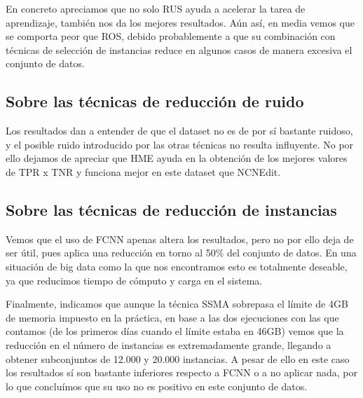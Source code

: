 En concreto apreciamos que no solo RUS ayuda a acelerar la tarea de aprendizaje, también nos da los mejores resultados. Aún así, en media vemos que se comporta peor que ROS, debido probablemente a que su combinación con técnicas de selección de instancias reduce en algunos casos de manera excesiva el conjunto de datos.

\subsection{Sobre las técnicas de reducción de ruido}

Los resultados dan a entender de que el dataset no es de por sí bastante ruidoso, y el posible ruido introducido por las otras técnicas no resulta influyente. No por ello dejamos de apreciar que HME ayuda en la obtención de los mejores valores de TPR x TNR y funciona mejor en este dataset que NCNEdit.

\subsection{Sobre las técnicas de reducción de instancias}

Vemos que el uso de FCNN apenas altera los resultados, pero no por ello deja de ser útil, pues aplica una reducción en torno al 50\% del conjunto de datos. En una situación de big data como la que nos encontramos esto es totalmente deseable, ya que reducimos tiempo de cómputo y carga en el sistema.

\vspace{\baselineskip}

Finalmente, indicamos que aunque la técnica SSMA sobrepasa el límite de 4GB de memoria impuesto en la práctica, en base a las dos ejecuciones con las que contamos (de los primeros días cuando el límite estaba en 46GB) vemos que la reducción en el número de instancias es extremadamente grande, llegando a obtener subconjuntos de 12.000 y 20.000 instancias.
A pesar de ello en este caso los resultados sí son bastante inferiores respecto a FCNN o a no aplicar nada, por lo que concluímos que su uso no es positivo en este conjunto de datos.

